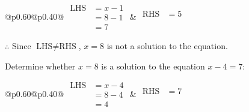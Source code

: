 \documentclass[12pt]{article}
\newcounter{minipagecount}
\begin{document}
\begin{multicols}{2}
\begin{minipage}[t]{0.40\textwidth}
    \noindent
    \renewcommand{\arraystretch}{1.3} %
    \begin{tabular}{@{}p{0.60\linewidth}@{}p{0.40\linewidth}@{}}
        \(\begin{aligned}
            \text{LHS} &= x - 1 \\
                    &= 8 - 1 \\
                    &= 7
        \end{aligned}\) &
        \(\begin{aligned}
            \text{RHS} &= 5\\
                    & \\
                    &
        \end{aligned}\)
    \end{tabular}
    \renewcommand{\arraystretch}{1.0} %
    \vspace{2pt}  %

    \noindent \(\therefore\) Since \(\text{LHS} \neq \text{RHS}\), \(x = 8\) is not  a solution to the equation.

\end{minipage}

 \vspace*{16pt}
\noindent{(\theminipagecount)}\hspace{0.1mm} %
\begin{minipage}[t]{0.40\textwidth} %

    \noindent Determine whether \(x = 8\) is a solution to the equation \(x - 4 = 7\):
    \vspace{4pt}  %

    \noindent
    \renewcommand{\arraystretch}{1.3} %
    \begin{tabular}{@{}p{0.60\linewidth}@{}p{0.40\linewidth}@{}}
        \(\begin{aligned}
            \text{LHS} &= x - 4 \\
                    &= 8 - 4 \\
                    &= 4
        \end{aligned}\) &
        \(\begin{aligned}
            \text{RHS} &= 7\\
                    & \\
                    &
        \end{aligned}\)
    \end{tabular}
    \renewcommand{\arraystretch}{1.0} %
    \vspace{2pt}  %


\end{minipage}
\end{multicols}
\end{document}
